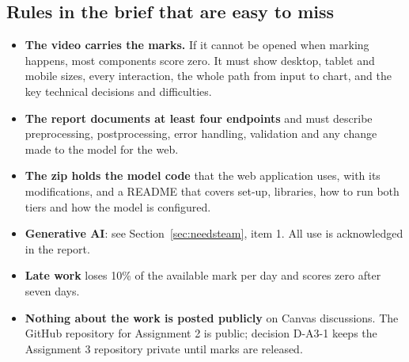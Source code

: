 \subsection{Rules in the brief that are easy to miss}

\begin{itemize}
  \item \textbf{The video carries the marks.} If it cannot be opened when marking happens, most
    components score zero. It must show desktop, tablet and mobile sizes, every interaction, the
    whole path from input to chart, and the key technical decisions and difficulties.
  \item \textbf{The report documents at least four endpoints} and must describe preprocessing,
    postprocessing, error handling, validation and any change made to the model for the web.
  \item \textbf{The zip holds the model code} that the web application uses, with its
    modifications, and a README that covers set-up, libraries, how to run both tiers and how the
    model is configured.
  \item \textbf{Generative AI}: see Section~\ref{sec:needsteam}, item 1. All use is acknowledged
    in the report.
  \item \textbf{Late work} loses 10\% of the available mark per day and scores zero after seven days.
  \item \textbf{Nothing about the work is posted publicly} on Canvas discussions. The GitHub
    repository for Assignment 2 is public; decision D-A3-1 keeps the Assignment 3 repository
    private until marks are released.
\end{itemize}

